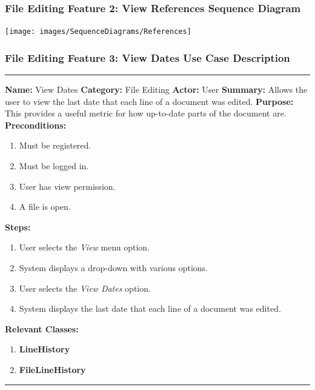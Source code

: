 \documentclass[twoside,letterpaper]{article}
\begin{document}
\subsubsection[File Editing Feature 2: View References Sequence Diagram]{\rmfamily\bfseries\color{black}
	File Editing Feature 2: View References Sequence Diagram}
\hypertarget{RefHeading22059017292}{}

\bigskip

\texttt{[image: images/SequenceDiagrams/References]}

\newpage

\subsubsection[File Editing Feature 3: View Dates]{\rmfamily\bfseries\color{black}
	File Editing Feature 3: View Dates Use Case Description}
\hypertarget{RefHeading22059017292}{}

\vspace{2pt}
\hrule
\vspace{8pt}
	\noindent\textbf{Name:} View Dates \newline
	\noindent\textbf{Category:} File Editing \newline
	\noindent\textbf{Actor:} User \newline
	\noindent\textbf{Summary:} Allows the user to view the last date that each line of a document was edited. \newline
	\noindent\textbf{Purpose:} This provides a useful metric for how up-to-date parts of the document are. \newline
	\noindent\textbf{Preconditions:}
	\begin{enumerate}
		\item Must be registered.
		\item Must be logged in.
		\item User has view permission.
		\item A file is open.
	\end{enumerate}
	\noindent\textbf{Steps:}
	\begin{enumerate}
		\item User selects the \textit{View} menu option.
		\item System displays a drop-down with various options.
		\item User selects the \textit{View Dates} option.
		\item System displays the last date that each line of a document was edited.
	\end{enumerate}
	\noindent\textbf{Relevant Classes:}
	\begin{enumerate}
		\item \textbf {LineHistory}
		\item \textbf {FileLineHistory}
	\end{enumerate}
\vspace{8pt}
\hrule
\newpage
\end{document}
